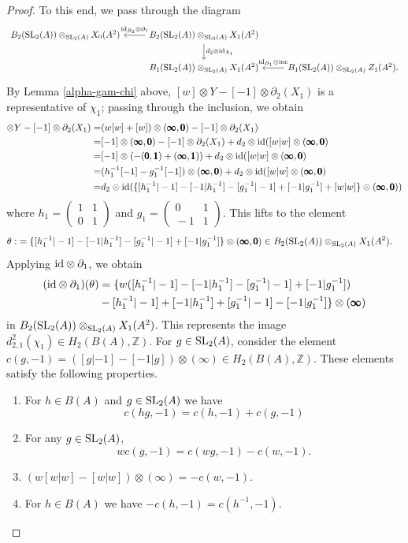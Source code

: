 \documentclass[11pt]{amsart}
\theoremstyle{definition}
\theoremstyle{plain}
\numberwithin{equation}{section}
\newcommand{\z}{\mathbb{Z}}
\newcommand{\SL}{\mathit{{\rm SL}}}
\newcommand{\id}{{\rm id}}
\newcommand{\inc}{{\rm inc}}
\newcommand{\mtxx}[4]
{\left(\!\!
\begin{array}{cc}
\!\!#1 & \!\!#2\\
\!\!#3 & \!\!#4
\end{array}\!\!
\right)}
\begin{document}
\begin{proof}
To this end, we pass through the diagram
\[
\begin{tikzcd}
	B_2(\SL_2(A))\otimes_{\SL_2(A)} X_0(A^ 2) & B_2(\SL_2(A))\otimes_{\SL_2(A)} X_1(A^2) 
	\ar["\id_{B_2}\otimes \partial_1"',  l] \ar[d, "d_2\otimes \id_{X_1}"] & \\
	& B_1(\SL_2(A))\otimes_{\SL_2(A)} X_1(A^ 2) & B_1(\SL_2(A))\otimes_{\SL_2(A)} 
	Z_1(A^2).\ar[l, "\id_{B_1}\otimes \inc"']
\end{tikzcd}
\]
By Lemma \ref{alpha-gam-chi} above, $[w]\otimes Y-[-1]\otimes\partial_2(X_1)$ is a representative of $\chi_1$; passing through the inclusion, we obtain
\begin{align*}
	[w]\otimes Y-[-1]\otimes\partial_2(X_1)=& (w[w]+[w])\otimes (\pmb{\infty},\pmb{0})-[-1]\otimes\partial_2(X_1)\\
    =&[-1]\otimes(\pmb{\infty},\pmb{0})-[-1]\otimes\partial_2(X_1)+d_2\otimes\id([w|w]\otimes(\pmb{\infty},\pmb{0})\\
    =&[-1]\otimes(-(\pmb{0},\pmb{1})+(\pmb{\infty},\pmb{1}))+d_2\otimes\id([w|w]\otimes(\pmb{\infty},\pmb{0})\\
    =&(h_1^{-1}[-1]-g_1^{-1}[-1])\otimes(\pmb{\infty},\pmb{0})+d_2\otimes\id([w|w]\otimes(\pmb{\infty},\pmb{0})\\
	=&d_2\otimes\id(\{[h^{-1}_1|-1]-[-1|h^{-1}_1]-[g^{-1}_1|-1]+[-1|g^{-1}_1]+[w|w]\}\otimes(\pmb{\infty},\pmb{0}))\\
\end{align*}
where $h_1=\mtxx{1}{1}{0}{1}$ and $g_1=\mtxx{0}{1}{-1}{1}$. This lifts to the element
\begin{align*}
	\theta:&=\{[h^{-1}_1|-1]-[-1|h^{-1}_1]-[g^{-1}_1|-1]+[-1|g^{-1}_1]\}\otimes(\pmb{\infty},\pmb{0})
	\in B_2(\SL_2(A))\otimes_{\SL_2(A)} X_1(A^2).
\end{align*}
Applying $\id\otimes\partial_1$, we obtain
\begin{align*}
	(\id\otimes\partial_1)(\theta)&=\{w([h^{-1}_1|-1]-[-1|h^{-1}_1]-[g^{-1}_1|-1]+[-1|g^{-1}_1])\\
	&-[h^{-1}_1|-1]+[-1|h^{-1}_1]+[g^{-1}_1|-1]-[-1|g^{-1}_1]\}\otimes(\pmb{\infty})
\end{align*}
in $B_2(\SL_2(A))\otimes_{\SL_2(A)} X_1(A^2)$. This represents the image $d^2_{2,1}(\chi_1)\in H_2(B(A),\z)$. For $g\in\SL_2(A)$, consider the element $c(g,-1)=([g|-1]-[-1|g])\otimes(\pmb{\infty})\in H_2(B(A),\z)$. These elements satisfy the following properties.
\begin{enumerate}
	\item For $h\in B(A)$ and $g\in\SL_2(A)$ we have
	\[
		c(hg,-1)=c(h,-1)+c(g,-1)
	\]
	\item For any $g\in\SL_2(A)$,
	\[
		wc(g,-1)=c(wg,-1)-c(w,-1).
	\]
    \item $(w[w|w]-[w|w])\otimes(\pmb{\infty})=-c(w,-1)$.
    \item For $h\in B(A)$ we have $-c(h,-1)=c(h^{-1},-1)$.
\end{enumerate}


\end{proof}
\end{document}
